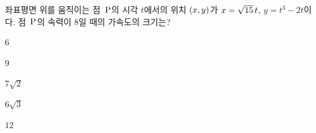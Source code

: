 좌표평면 위를 움직이는 점~$\mathrm{P}$의 시각 $t$에서의 위치 $(x{,}\mkern3mu\mathopen{}y)$가 $x=\sqrt{15}\mkern3mu t$, $y=t^3-2t$이다. 점~$\mathrm{P}$의 속력이 $8$일 때의 가속도의 크기는?
\begin{choices32}{\rule[-3ex]{0pt}{8ex}$6$}{\rule[-3ex]{0pt}{8ex}$9$}{\rule[-3ex]{0pt}{8ex}$7\sqrt{2}$}{\rule[-3ex]{0pt}{8ex}$6\sqrt{3}$}{\rule[-3ex]{0pt}{8ex}$12$}\end{choices32}

